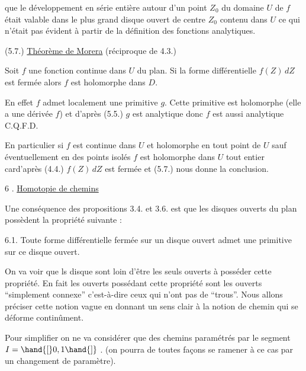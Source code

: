 
que le développement en série entière autour d'un point $Z_0$ du domaine $U$
de $f$ était valable dans le plus grand disque ouvert de centre $Z_0$ contenu
dans $U$ ce qui n'était pas évident à partir de la définition des fonctions
analytiques.

(5.7.) \uline{Théorème de Morera} (réciproque de 4.3.)

Soit $f$ une fonction continue dans  $U$ du plan. Si la forme
différentielle $f(Z)\,dZ$ est fermée alors $f$ est holomorphe dans $D$.

En effet $f$ admet localement une primitive $g$. Cette primitive est
holomorphe (elle a une dérivée $f$) et d'après (5.5.) $g$ est analytique donc
$f$ est aussi analytique C.Q.F.D.

En particulier si $f$ est continue dans $U$ et holomorphe en tout point de $U$
sauf éventuellement en des points isolés $f$ est holomorphe dans $U$ tout
entier card'après (4.4.) $f(Z)\,dZ$ est fermée et (5.7.) nous donne la
conclusion.

6 . \uline{Homotopie de chemins}

Une conséquence des propositions 3.4. et 3.6. est que les disques
ouverts du plan possèdent la propriété suivante :

6.1. Toute forme différentielle fermée sur un disque ouvert admet une
primitive sur ce disque ouvert.

On va voir que ls disque sont loin d'être les seuls ouverts à posséder cette
propriété. En fait les ouverts possédant cette propriété sont les ouverts
``simplement connexe'' c'est-à-dire ceux qui n'ont pas de ``trous''. Nous allons
préciser cette notion vague en donnant un sens clair à la notion de chemin qui
se déforme continûment.

Pour simplifier on ne va considérer que des chemins paramétrés par le segment
$I = \hand{[}0,1\hand{]}$ . (on pourra de toutes façons se ramener à ce cas par un changement
de paramètre).

